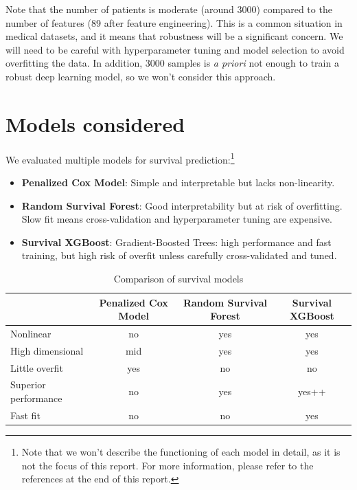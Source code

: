 \documentclass{article}
\begin{document}
Note that the number of patients is moderate (around 3000) compared to the number of features (89 after feature engineering). This is a common situation in medical datasets, and it means that robustness will be a significant concern. We will need to be careful with hyperparameter tuning and model selection to avoid overfitting the data. In addition, 3000 samples is \textit{a priori} not enough to train a robust deep learning model, so we won't consider this approach.

\section{Models considered}
We evaluated multiple models for survival prediction:\footnote{Note that we won't describe the functioning of each model in detail, as it is not the focus of this report. For more information, please refer to the references at the end of this report.}
\begin{itemize}
    \item \textbf{Penalized Cox Model}: Simple and interpretable but lacks non-linearity.
    \item \textbf{Random Survival Forest}: Good interpretability but at risk of overfitting. Slow fit means cross-validation and hyperparameter tuning are expensive.
    \item \textbf{Survival XGBoost}: Gradient-Boosted Trees: high performance and fast training, but high risk of overfit unless carefully cross-validated and tuned.
\end{itemize}

\begin{table}[h]
    \centering
    \begin{tabular}{|l|c|c|c|}
        \hline
        & Penalized Cox Model & Random Survival Forest & Survival XGBoost \\
        \hline
        Nonlinear & no & yes & yes \\
        \hline
        High dimensional & mid & yes & yes \\
        \hline
        Little overfit & yes & no & no \\
        \hline
        Superior performance & no & yes & yes++ \\
        \hline
        Fast fit & no & no & yes \\
        \hline
    \end{tabular}
    \caption{Comparison of survival models}
    \label{tab:survival_models}
\end{table}
\end{document}
